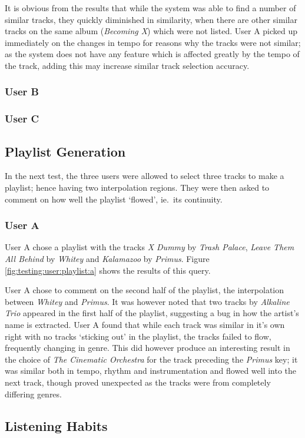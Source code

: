 It is obvious from the results that while the system was able to find a number of similar tracks, they quickly diminished in similarity, when there are other similar tracks on the same album (\emph{Becoming X}) which were not listed. User A picked up immediately on the changes in tempo for reasons why the tracks were not similar; as the system does not have any feature which is affected greatly by the tempo of the track, adding this may increase similar track selection accuracy.
\subsubsection{User B}
\subsubsection{User C}
\subsection{Playlist Generation}
In the next test, the three users were allowed to select three tracks to make a playlist; hence having two interpolation regions. They were then asked to comment on how well the playlist `flowed', ie.\ its continuity.
\subsubsection{User A}
User A chose a playlist with the tracks \emph{X Dummy} by \emph{Trash Palace}, \emph{Leave Them All Behind} by \emph{Whitey} and \emph{Kalamazoo} by \emph{Primus}. Figure \ref{fig:testing:user:playlist:a} shows the results of this query.

User A chose to comment on the second half of the playlist, the interpolation between \emph{Whitey} and \emph{Primus}. It was however noted that two tracks by \emph{Alkaline Trio} appeared in the first half of the playlist, suggesting a bug in how the artist's name is extracted. User A found that while each track was similar in it's own right with no tracks `sticking out' in the playlist, the tracks failed to flow, frequently changing in genre. This did however produce an interesting result in the choice of \emph{The Cinematic Orchestra} for the track preceding the \emph{Primus} key; it was similar both in tempo, rhythm and instrumentation and flowed well into the next track, though proved unexpected as the tracks were from completely differing genres.


\subsection{Listening Habits}
